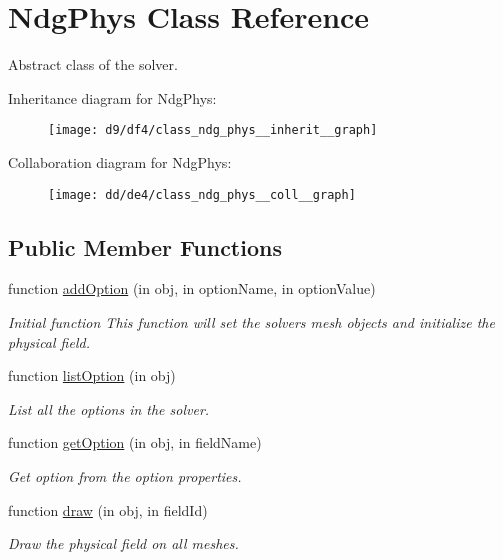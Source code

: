 \hypertarget{class_ndg_phys}{}\section{Ndg\+Phys Class Reference}
\label{class_ndg_phys}


Abstract class of the solver.  




Inheritance diagram for Ndg\+Phys\+:
\nopagebreak
\begin{figure}[H]
\begin{center}
\leavevmode
\texttt{[image: d9/df4/class\_ndg\_phys\_\_inherit\_\_graph]}
\end{center}
\end{figure}


Collaboration diagram for Ndg\+Phys\+:
\nopagebreak
\begin{figure}[H]
\begin{center}
\leavevmode
\texttt{[image: dd/de4/class\_ndg\_phys\_\_coll\_\_graph]}
\end{center}
\end{figure}
\subsection*{Public Member Functions}
\begin{DoxyCompactItemize}
\item 
function \hyperlink{class_ndg_phys_a631029803efe8a9280e5ef2429079455}{add\+Option} (in obj, in option\+Name, in option\+Value)
\begin{DoxyCompactList}\small\item\em Initial function This function will set the solver\textquotesingle{}s mesh objects and initialize the physical field. \end{DoxyCompactList}\item 
function \hyperlink{class_ndg_phys_aaa9da2298c1eeaa1dc45207b0ac23d44}{list\+Option} (in obj)
\begin{DoxyCompactList}\small\item\em List all the options in the solver. \end{DoxyCompactList}\item 
function \hyperlink{class_ndg_phys_ae99693ff913e6c950de6fbf4544042cf}{get\+Option} (in obj, in field\+Name)
\begin{DoxyCompactList}\small\item\em Get option from the option properties. \end{DoxyCompactList}\item 
function \hyperlink{class_ndg_phys_ac749312091f3342a316fb25e61610a77}{draw} (in obj, in field\+Id)
\begin{DoxyCompactList}\small\item\em Draw the physical field on all meshes. \end{DoxyCompactList}\end{DoxyCompactItemize}
